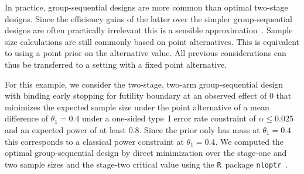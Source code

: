 \documentclass[12pt]{article}
\begin{document}
In practice, group-sequential designs are more common than optimal two-stage designs.
Since the efficiency gains of the latter over the simpler group-sequential designs
are often practically irrelevant this is a sensible approximation~\citep{wassmer2016}.
Sample size calculations are still commonly based on point alternatives.
This is equivalent to using a point prior on the alternative value.
All previous considerations can thus be transferred to a setting with a fixed
point alternative.

For this example, we consider the two-stage, two-arm group-sequential design with binding early stopping for futility boundary at an observed effect of $0$ that minimizes the expected sample size under the point alternative of a mean difference of $\theta_1=0.4$ under a one-sided type~I error rate constraint of $\alpha \leq 0.025$ and  an expected power of at least $0.8$.
Since the prior only has mass at $\theta_1=0.4$ this corresponds to a classical power constraint at $\theta_1=0.4$.
We computed the optimal group-sequential design by direct minimization over the stage-one and two sample sizes and the stage-two critical value using the \texttt{R}~package \texttt{nloptr}~\cite{nloptr}.
\end{document}
